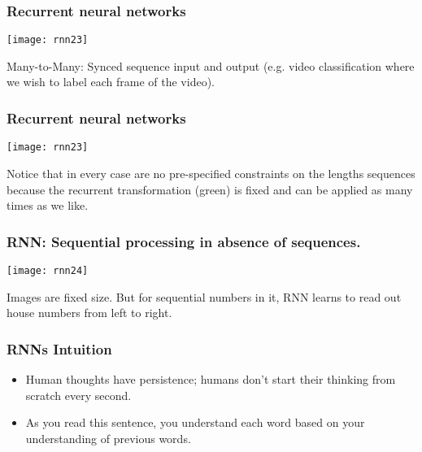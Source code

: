 \begin{frame}[fragile] \frametitle{Recurrent neural networks}
\begin{center}
\texttt{[image: rnn23]}
\end{center}
Many-to-Many: Synced sequence input and output (e.g. video classification where we wish to label each frame of the video).
\end{frame}

\begin{frame}[fragile] \frametitle{Recurrent neural networks}
\begin{center}
\texttt{[image: rnn23]}
\end{center}
Notice that in every case are no pre-specified constraints on the lengths sequences because the recurrent transformation (green) is fixed and can be applied as many times as we like.
\end{frame}



\begin{frame}[fragile] \frametitle{RNN: Sequential processing in absence of sequences.}
\begin{center}
\texttt{[image: rnn24]}
\end{center}
Images are fixed size. But for sequential numbers in it, RNN learns to read out house numbers from left to right.
\end{frame}










\begin{frame}[fragile] \frametitle{RNNs Intuition}

\begin{itemize}
\item Human thoughts have persistence; humans don't start their thinking from scratch every second. 
\item As you read this sentence, you understand each word based on your understanding of previous words.  
\end{itemize}
\end{frame}

